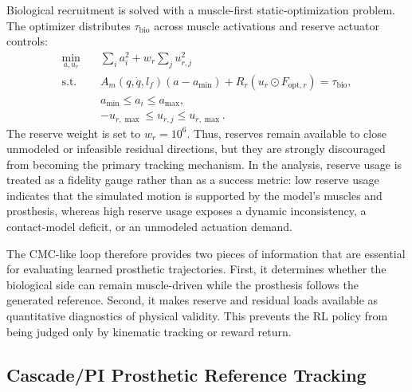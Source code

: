 Biological recruitment is solved with a muscle-first static-optimization
problem. The optimizer distributes \(\tau_{\mathrm{bio}}\) across muscle
activations and reserve actuator controls:
\begin{equation}
\begin{aligned}
\min_{a,u_r}\quad
& \sum_i a_i^2 + w_r \sum_j u_{r,j}^2 \\
\mathrm{s.t.}\quad
& A_m(q,\dot{q},l_f)(a-a_{\min})
  + R_r(u_r \odot F_{\mathrm{opt},r})
  = \tau_{\mathrm{bio}}, \\
& a_{\min} \leq a_i \leq a_{\max}, \\
& -u_{r,\max} \leq u_{r,j} \leq u_{r,\max}.
\end{aligned}
\label{eq:static-optimization}
\end{equation}
The reserve weight is set to \(w_r=10^6\). Thus, reserves remain available to
close unmodeled or infeasible residual directions, but they are strongly
discouraged from becoming the primary tracking mechanism. In the analysis,
reserve usage is treated as a fidelity gauge rather than as a success metric:
low reserve usage indicates that the simulated motion is supported by the
model's muscles and prosthesis, whereas high reserve usage exposes a dynamic
inconsistency, a contact-model deficit, or an unmodeled actuation demand.

The CMC-like loop therefore provides two pieces of information that are
essential for evaluating learned prosthetic trajectories. First, it determines
whether the biological side can remain muscle-driven while the prosthesis
follows the generated reference. Second, it makes reserve and residual loads
available as quantitative diagnostics of physical validity. This prevents the
RL policy from being judged only by kinematic tracking or reward return.



\subsection{Cascade/PI Prosthetic Reference Tracking}
\label{subsec:prosthetic-controller}

